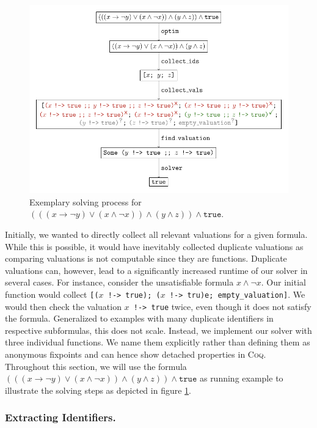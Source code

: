 \begin{figure}[t]
    \centering
    \includegraphics[scale=0.9]{figures/solver.pdf}
    \caption{Exemplary solving process for $(((x \rightarrow \neg y) \lor (x \land \neg x)) \land (y \land z)) \land \texttt{true}$.}
    \label{fig:solver}
\end{figure}

Initially, we wanted to directly collect all relevant valuations for a given formula.
While this is possible, it would have inevitably collected duplicate valuations as comparing valuations is not computable since they are functions.
Duplicate valuations can, however, lead to a significantly increased runtime of our solver in several cases.
For instance, consider the unsatisfiable formula $x \land \neg x$.
Our initial function would collect \texttt{[($x$ !-> true); ($x$ !-> tru)e; empty\_valuation]}.
We would then check the valuation \texttt{$x$ !-> true} twice, even though it does not satisfy the formula.
Generalized to examples with many duplicate identifiers in respective subformulas, this does not scale.
Instead, we implement our solver with three individual functions.
We name them explicitly rather than defining them as anonymous fixpoints and can hence show detached properties in \textsc{Coq}.
Throughout this section, we will use the formula $(((x \rightarrow \neg y) \lor (x \land \neg x)) \land (y \land z)) \land \texttt{true}$ as running example to illustrate the solving steps as depicted in figure \ref{fig:solver}.

\subsubsection{Extracting Identifiers.}

